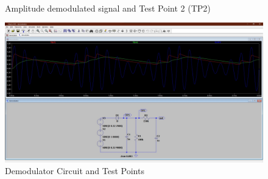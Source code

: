 \documentclass[12pt]{article}
\begin{document}
\begin{figure}[H]
    \\
    \vspace{-14pt}
    \caption{Amplitude demodulated signal and Test Point 2 (TP2)}
    \label{fig:Amplitude_Demodulated_Signal_TP2}
\end{figure}

\begin{figure}[h]
    \centering
    \includegraphics[width=1\textwidth]{LTSpice_circuit/demod_sim.jpg}
    \caption{Demodulator Circuit and Test Points}
    \label{fig:demod_sim}
\end{figure}
\end{document}
